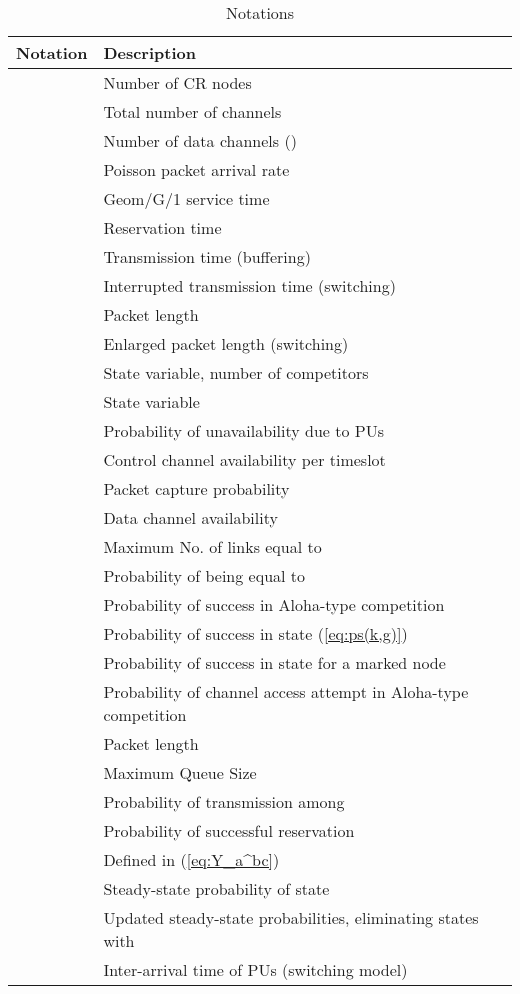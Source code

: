 \documentclass[12pt,journal,oneside,onecolumn]{IEEEtran}
\begin{document}
\begin{table}[]
\caption{{Notations}}
\label{tab:notations}
\centering
\begin{tabular} {c|l}
\hline
\scriptsize
{\textbf{Notation}} & {\textbf {Description}} \\
 \hline
& Number of CR nodes\\
& Total number of channels\\
& Number of data channels ()\\
& Poisson packet arrival rate\\
& Geom/G/1 service time \\
& Reservation time \\
& Transmission time (buffering) \\
& Interrupted transmission time (switching) \\
& Packet length \\
& Enlarged packet length (switching) \\
& State variable, number of competitors\\
& State variable\\
    & Probability of unavailability due to PUs\\
&Control channel availability per timeslot\\
&Packet capture probability\\
&Data channel availability \\
& Maximum No. of links equal to \\
& Probability of  being equal to \\
& Probability of success in Aloha-type competition \\
& Probability of success in state (\ref{eq:ps(k,g)}) \\
& Probability of success in state for a marked node\\
& Probability of channel access attempt in Aloha-type competition\\
& Packet length\\
& Maximum Queue Size\\
& Probability of  transmission among \\
& Probability of  successful reservation\\
& Defined in (\ref{eq:Y_a^bc})\\
& Steady-state probability of state \\
& Updated steady-state probabilities, eliminating states with \\
& Inter-arrival time of PUs (switching model)\\
\hline
\end{tabular}
\normalsize
\end{table}
\normalsize
\end{document}
